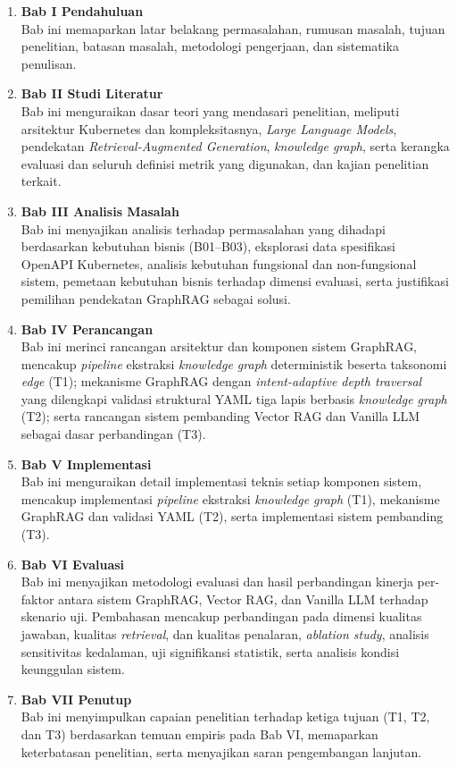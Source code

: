 \begin{enumerate}
    \item \textbf{Bab I Pendahuluan} \\
    Bab ini memaparkan latar belakang permasalahan, rumusan masalah, tujuan penelitian, batasan masalah, metodologi pengerjaan, dan sistematika penulisan.

    \item \textbf{Bab II Studi Literatur} \\
    Bab ini menguraikan dasar teori yang mendasari penelitian, meliputi arsitektur Kubernetes dan kompleksitasnya, \textit{Large Language Models}, pendekatan \textit{Retrieval-Augmented Generation}, \textit{knowledge graph}, serta kerangka evaluasi dan seluruh definisi metrik yang digunakan, dan kajian penelitian terkait.

    \item \textbf{Bab III Analisis Masalah} \\
    Bab ini menyajikan analisis terhadap permasalahan yang dihadapi berdasarkan kebutuhan bisnis (B01--B03), eksplorasi data spesifikasi OpenAPI Kubernetes, analisis kebutuhan fungsional dan non-fungsional sistem, pemetaan kebutuhan bisnis terhadap dimensi evaluasi, serta justifikasi pemilihan pendekatan GraphRAG sebagai solusi.

    \item \textbf{Bab IV Perancangan} \\
    Bab ini merinci rancangan arsitektur dan komponen sistem GraphRAG, mencakup \textit{pipeline} ekstraksi \textit{knowledge graph} deterministik beserta taksonomi \textit{edge} (T1); mekanisme GraphRAG dengan \textit{intent-adaptive depth traversal} yang dilengkapi validasi struktural YAML tiga lapis berbasis \textit{knowledge graph} (T2); serta rancangan sistem pembanding Vector RAG dan Vanilla LLM sebagai dasar perbandingan (T3).

    \item \textbf{Bab V Implementasi} \\
    Bab ini menguraikan detail implementasi teknis setiap komponen sistem, mencakup implementasi \textit{pipeline} ekstraksi \textit{knowledge graph} (T1), mekanisme GraphRAG dan validasi YAML (T2), serta implementasi sistem pembanding (T3).

    \item \textbf{Bab VI Evaluasi} \\
    Bab ini menyajikan metodologi evaluasi dan hasil perbandingan kinerja per-faktor antara sistem GraphRAG, Vector RAG, dan Vanilla LLM terhadap skenario uji. Pembahasan mencakup perbandingan pada dimensi kualitas jawaban, kualitas \textit{retrieval}, dan kualitas penalaran, \textit{ablation study}, analisis sensitivitas kedalaman, uji signifikansi statistik, serta analisis kondisi keunggulan sistem.

    \item \textbf{Bab VII Penutup} \\
    Bab ini menyimpulkan capaian penelitian terhadap ketiga tujuan (T1, T2, dan T3) berdasarkan temuan empiris pada Bab VI, memaparkan keterbatasan penelitian, serta menyajikan saran pengembangan lanjutan.
\end{enumerate}